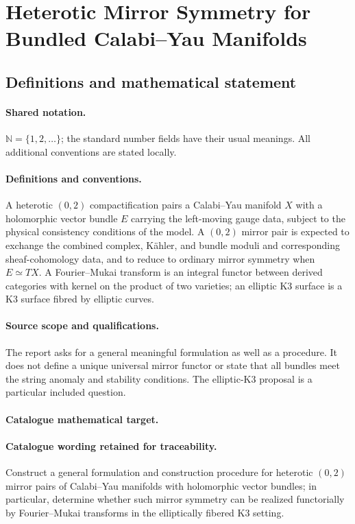 \documentclass[11pt]{article}
\begin{document}
\section{Heterotic Mirror Symmetry for Bundled Calabi–Yau Manifolds}\label{statement}

\subsection{Definitions and mathematical statement}

\paragraph{Shared notation.}$\mathbb N=\{1,2,\ldots\}$; the standard number fields have their usual meanings. All additional conventions are stated locally.


\paragraph{Definitions and conventions.} A heterotic $(0,2)$ compactification pairs a Calabi--Yau manifold $X$ with a holomorphic vector bundle $E$ carrying the left-moving gauge data, subject to the physical consistency conditions of the model. A $(0,2)$ mirror pair is expected to exchange the combined complex, Kähler, and bundle moduli and corresponding sheaf-cohomology data, and to reduce to ordinary mirror symmetry when $E\simeq TX$. A Fourier--Mukai transform is an integral functor between derived categories with kernel on the product of two varieties; an elliptic K3 surface is a K3 surface fibred by elliptic curves.

\paragraph{Source scope and qualifications.} The report asks for a general meaningful formulation as well as a procedure. It does not define a unique universal mirror functor or state that all bundles meet the string anomaly and stability conditions. The elliptic-K3 proposal is a particular included question.

\paragraph{Catalogue mathematical target.}
\paragraph{Catalogue wording retained for traceability.}
Construct a general formulation and construction procedure for heterotic $(0,2)$ mirror pairs of Calabi–Yau manifolds with holomorphic vector bundles; in particular, determine whether such mirror symmetry can be realized functorially by Fourier–Mukai transforms in the elliptically fibered K3 setting.
\end{document}
